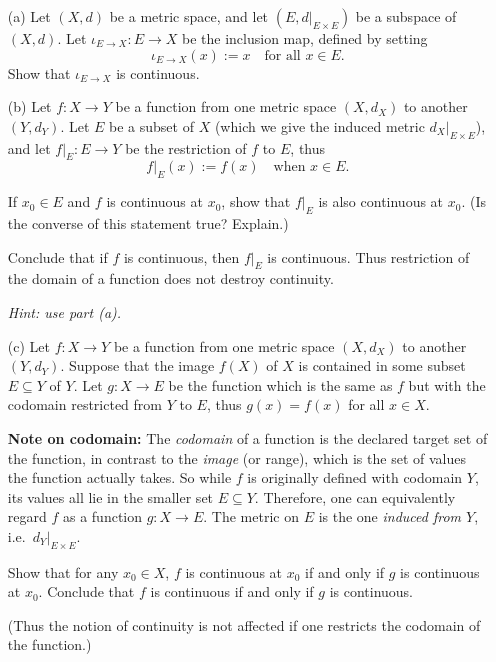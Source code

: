 \begin{problem}[24pts]
  \vphantom{text}
  \begin{enumerate}

  \item[(a)] 
Let $(X,d)$ be a metric space, and let $(E,d|_{E \times E})$ be a subspace of $(X,d)$.  
Let $\iota_{E \to X} : E \to X$ be the inclusion map, defined by setting 
\[
\iota_{E \to X}(x) := x \quad \text{for all } x \in E.
\]  
Show that $\iota_{E \to X}$ is continuous.

 \item[(b)] Let $f : X \to Y$ be a function from one metric space $(X,d_X)$ to another $(Y,d_Y)$.  
Let $E$ be a subset of $X$ (which we give the induced metric $d_X|_{E \times E}$), and let $f|_E : E \to Y$ be the restriction of $f$ to $E$, thus
\[
f|_E(x) := f(x) \quad \text{when } x \in E.
\]  

If $x_0 \in E$ and $f$ is continuous at $x_0$, show that $f|_E$ is also continuous at $x_0$.  
(Is the converse of this statement true? Explain.)  

Conclude that if $f$ is continuous, then $f|_E$ is continuous.  
Thus restriction of the domain of a function does not destroy continuity.  

\emph{Hint: use part (a).}
 
 \item[(c)] 
Let $f : X \to Y$ be a function from one metric space $(X,d_X)$ to another $(Y,d_Y)$.  
Suppose that the image $f(X)$ of $X$ is contained in some subset $E \subseteq Y$ of $Y$.  
Let $g : X \to E$ be the function which is the same as $f$ but with the codomain restricted from $Y$ to $E$, thus $g(x) = f(x)$ for all $x \in X$.  

\medskip
\textbf{Note on codomain:}  
The \emph{codomain} of a function is the declared target set of the function, in contrast to the \emph{image} (or range), which is the set of values the function actually takes.  
So while $f$ is originally defined with codomain $Y$, its values all lie in the smaller set $E \subseteq Y$.  
Therefore, one can equivalently regard $f$ as a function $g : X \to E$.  
The metric on $E$ is the one \emph{induced from $Y$}, i.e.\ $d_Y|_{E \times E}$.

\medskip
Show that for any $x_0 \in X$, $f$ is continuous at $x_0$ if and only if $g$ is continuous at $x_0$.  
Conclude that $f$ is continuous if and only if $g$ is continuous.  

(Thus the notion of continuity is not affected if one restricts the codomain of the function.)

\end{enumerate}
\end{problem}


